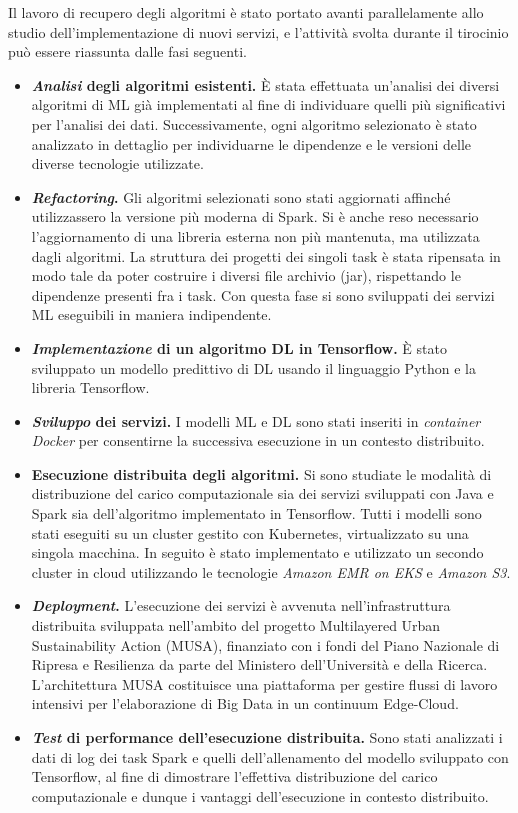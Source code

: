 \documentclass[11pt]{article}
\begin{document}
Il lavoro di recupero degli algoritmi è stato portato avanti parallelamente allo studio dell'implemen\-ta\-zio\-ne di nuovi servizi, e l'attività svolta durante il tirocinio può essere riassunta dalle fasi seguenti.

\begin{itemize}
    \item \textbf{\emph{Analisi} degli algoritmi esistenti.} È stata effettuata un'analisi dei diversi algoritmi di ML già implementati al fine di individuare quelli più significativi per l'analisi dei dati. Successivamente, ogni algoritmo selezionato è stato analizzato in dettaglio per individuarne le dipendenze e le versioni delle diverse tecnologie utilizzate.
    \item \textbf{\emph{Refactoring}.} Gli algoritmi selezionati sono stati aggiornati affinché utilizzassero la versione più moderna di Spark. Si è anche reso necessario l'aggiornamento di una libreria esterna non più mantenuta, ma utilizzata dagli algoritmi. La struttura dei progetti dei singoli task è stata ripensata in modo tale da poter costruire i diversi file archivio (jar), rispettando le dipendenze presenti fra i task. Con questa fase si sono sviluppati dei servizi ML eseguibili in maniera indipendente.
    \item \textbf{\emph{Implementazione} di un algoritmo DL in Tensorflow.} È stato sviluppato un modello predittivo di DL usando il linguaggio Python e la libreria Tensorflow.
    \item \textbf{\emph{Sviluppo} dei servizi.} I modelli ML e DL sono stati inseriti in \emph{container Docker} per consentirne la successiva esecuzione in un contesto distribuito.
    \item \textbf{Esecuzione distribuita degli algoritmi.} Si sono studiate le modalità di distribuzione del carico computazionale sia dei servizi sviluppati con Java e Spark sia dell'algoritmo implementato in Tensorflow. Tutti i modelli sono stati eseguiti su un cluster gestito con Kubernetes, virtualizzato su una singola macchina. In seguito è stato implementato e utilizzato un secondo cluster in cloud utilizzando le tecnologie \emph{Amazon EMR on EKS} e \emph{Amazon S3}.
    \item \textbf{\emph{Deployment}.} L'esecuzione dei servizi è avvenuta nell'infrastruttura distribuita sviluppata nell'ambito del progetto Multilayered Urban Sustainability Action (MUSA), finanziato con i fondi del Piano Nazionale di Ripresa e Resilienza da parte del Ministero dell'Università e della Ricerca. L'architettura MUSA costituisce una piattaforma per gestire flussi di lavoro intensivi per l’elaborazione di Big Data in un continuum Edge-Cloud.
    \item \textbf{\emph{Test} di performance dell'esecuzione distribuita.} Sono stati analizzati i dati di log dei task Spark e quelli dell'allenamento del modello sviluppato con Tensorflow, al fine di dimostrare l'effettiva distribuzione del carico computazionale e dunque i vantaggi dell'esecuzione in contesto distribuito.
\end{itemize}
\end{document}
